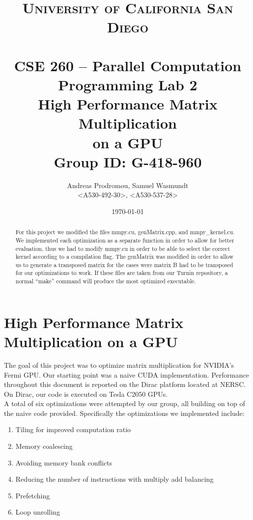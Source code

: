 \documentclass[paper=a4, fontsize=11pt]{scrartcl} %
\title{	
\normalfont \normalsize 
\textsc{University of California San Diego} \\ [25pt] %
\horrule{0.5pt} \\[0.4cm] %
\huge CSE 260 -- Parallel Computation \\ Programming Lab 2 \\ High Performance Matrix Multiplication\\on a GPU\\ Group ID: G-418-960 %
\horrule{2pt} \\[0.5cm] %
}
\author{Andreas Prodromou, Samuel Wasmundt \\ <A530-492-30>, <A530-537-28>} %
\date{\normalsize\today} %
\numberwithin{equation}{section} %
\numberwithin{figure}{section} %
\numberwithin{table}{section} %
\begin{document}
\maketitle %


\begin{abstract}
For this project we modified the files mmpy.cu, genMatrix.cpp, and mmpy\_kernel.cu. We implemented each optimization as a separate function in order to allow for better evaluation, thus we had to modify mmpy.cu in order to be able to select the correct kernel according to a compilation flag. The genMatrix was modified in order to allow us to generate a transposed matrix for the cases were matrix B had to be transposed for our optimizations to work. If these files are taken from our Turnin repository, a normal ``make'' command will produce the most optimized executable.
\end{abstract}

\section{\textbf{High Performance Matrix Multiplication on a GPU}}

The goal of this project was to optimize matrix multiplication for NVIDIA's Fermi GPU. Our starting point was a naive CUDA implementation. Performance throughout this document is reported on the Dirac platform located at NERSC. On Dirac, our code is executed on Tesla C2050 GPUs.\\

A total of six optimizations were attempted by our group, all building on top of the naive code provided. Specifically the optimizations we implemented include:

\begin{enumerate}
\item Tiling for improved computation ratio
\item Memory coalescing
\item Avoiding memory bank conflicts
\item Reducing the number of instructions with multiply add balancing
\item Prefetching
\item Loop unrolling
\end{enumerate}
\end{document}
